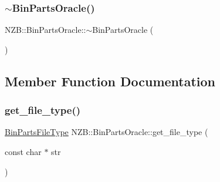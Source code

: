 \hypertarget{class_n_z_b_1_1_bin_parts_oracle_af452167527f6b24d4cf3ae791919cbf4}{}\label{class_n_z_b_1_1_bin_parts_oracle_af452167527f6b24d4cf3ae791919cbf4} 
\subsubsection{\texorpdfstring{$\sim$\+Bin\+Parts\+Oracle()}{~BinPartsOracle()}}
{\footnotesize\ttfamily N\+Z\+B\+::\+Bin\+Parts\+Oracle\+::$\sim$\+Bin\+Parts\+Oracle (\begin{DoxyParamCaption}{ }\end{DoxyParamCaption})}



\subsection{Member Function Documentation}
\hypertarget{class_n_z_b_1_1_bin_parts_oracle_aa861eee521123494f6d5672db18a726c}{}\label{class_n_z_b_1_1_bin_parts_oracle_aa861eee521123494f6d5672db18a726c} 
\subsubsection{\texorpdfstring{get\+\_\+file\+\_\+type()}{get\_file\_type()}}
{\footnotesize\ttfamily \hyperlink{bin_parts_8h_aa1299690332d809ca3f8cb77e7019e41}{Bin\+Parts\+File\+Type} N\+Z\+B\+::\+Bin\+Parts\+Oracle\+::get\+\_\+file\+\_\+type (\begin{DoxyParamCaption}\item[{const char $\ast$}]{str }\end{DoxyParamCaption})}

\hypertarget{class_n_z_b_1_1_bin_parts_oracle_a5d3259b1456cf13a3f735415f2bdb92e}{}\label{class_n_z_b_1_1_bin_parts_oracle_a5d3259b1456cf13a3f735415f2bdb92e} 

